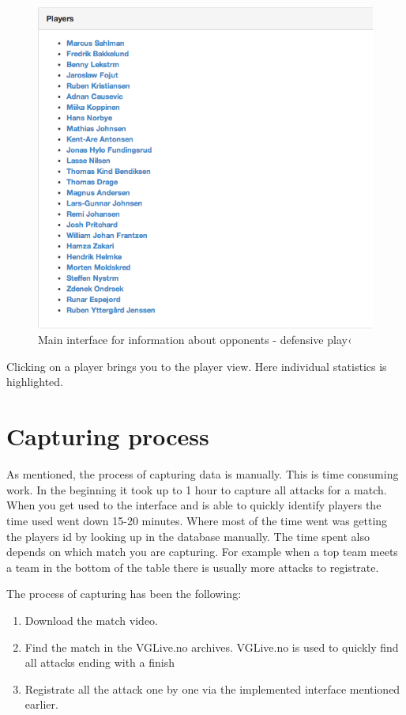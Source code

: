 \begin{figure}[ht!]
\centering
\includegraphics[width=1\textwidth]{images/general/team_analysis3.png}
\caption{Main interface for information about opponents - defensive play‹}
\label{fig:team_analysis2}
\end{figure}

Clicking on a player brings you to the player view. Here individual statistics is highlighted. 

\section{Capturing process}

As mentioned, the process of capturing data is manually. This is time consuming work. In the beginning it took up to 1 hour to capture all attacks for a match. When you get used to the interface and is able to quickly identify players the time used went down 15-20 minutes. Where most of the time went was getting the players id by looking up in the database manually. The time spent also depends on which match you are capturing. For example when a top team meets a team in the bottom of the table there is usually more attacks to registrate. 

The process of capturing has been the following:
\begin{enumerate}
  \item Download the match video.
  \item Find the match in the VGLive.no archives. VGLive.no is used to quickly find all attacks ending with a finish
  \item Registrate all the attack one by one via the implemented interface mentioned earlier.
\end{enumerate}
